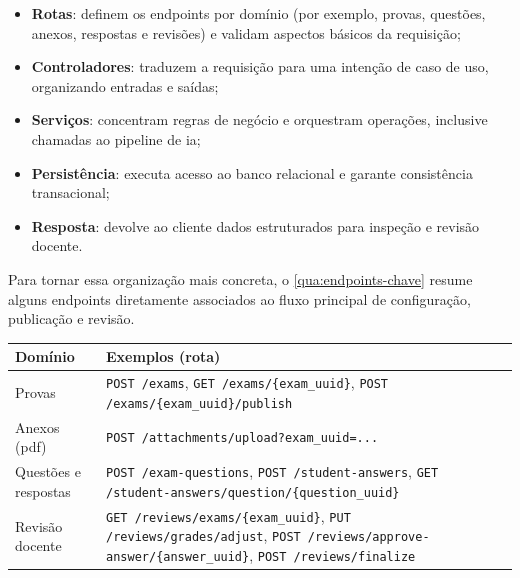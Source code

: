 \begin{itemize}
    \item \textbf{Rotas}: definem os endpoints por domínio (por exemplo, provas, questões, anexos, respostas e revisões) e validam aspectos básicos da requisição;
    \item \textbf{Controladores}: traduzem a requisição para uma intenção de caso de uso, organizando entradas e saídas;
    \item \textbf{Serviços}: concentram regras de negócio e orquestram operações, inclusive chamadas ao pipeline de \gls{ia};
    \item \textbf{Persistência}: executa acesso ao banco relacional e garante consistência transacional;
    \item \textbf{Resposta}: devolve ao cliente dados estruturados para inspeção e revisão docente.
\end{itemize}

Para tornar essa organização mais concreta, o \autoref{qua:endpoints-chave} resume alguns endpoints diretamente associados ao fluxo principal de configuração, publicação e revisão.

\begin{quadro}[H]
    \centering
    \caption{Exemplos de endpoints do fluxo principal do sistema}
    \label{qua:endpoints-chave}
    {\small
    \begin{tabular}{|p{}|p{}|}
        \hline
        \textbf{Domínio} & \textbf{Exemplos (rota)} \\
        \hline
        Provas & \texttt{POST /exams},\newline
        \texttt{GET \allowbreak /exams\allowbreak /\{exam\_uuid\}},\newline
        \texttt{POST \allowbreak /exams\allowbreak /\{exam\_uuid\}\allowbreak /publish} \\
        \hline
        Anexos (\gls{pdf}) & \texttt{POST \allowbreak /attachments\allowbreak /upload\allowbreak ?exam\_uuid=...} \\
        \hline
        Questões e respostas & \texttt{POST /exam-questions},\newline
        \texttt{POST /student-answers},\newline
        \texttt{GET \allowbreak /student-answers\allowbreak /question\allowbreak /\{question\_uuid\}} \\
        \hline
        Revisão docente & \texttt{GET \allowbreak /reviews\allowbreak /exams\allowbreak /\{\allowbreak exam\_\allowbreak uuid\allowbreak \}},\newline
        \texttt{PUT \allowbreak /reviews\allowbreak /grades\allowbreak /adjust},\newline
        \texttt{POST \allowbreak /reviews\allowbreak /approve-\allowbreak answer\allowbreak /\{\allowbreak answer\_\allowbreak uuid\allowbreak \}},\newline
        \texttt{POST \allowbreak /reviews\allowbreak /finalize} \\
        \hline
    \end{tabular}
    }
\end{quadro}

